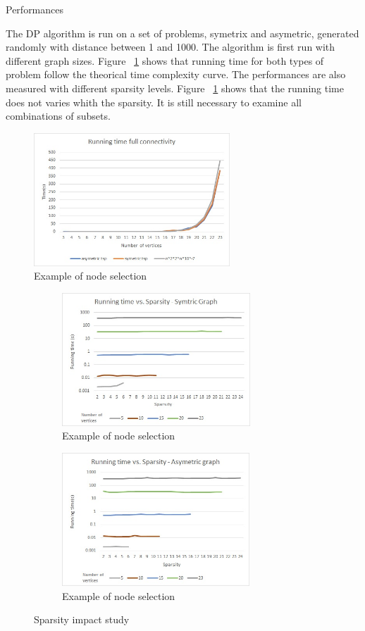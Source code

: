 \documentclass[../report.tex]{subfiles}
\begin{document}
\begin{subsection}{Performances}

The DP algorithm is run on a set of problems, symetrix and asymetric, generated randomly with distance between 1 and 1000. 
The algorithm is first run with different graph sizes. Figure ~\ref{fig:dpgraphsize} shows that running time for both types of problem follow the theorical time complexity curve.
The performances are also measured with different sparsity levels. Figure ~\ref{fig:dpgraphsize} shows that the running time does not varies whith the sparsity. It is still necessary to examine all combinations of subsets.


\begin{figure}[H]
\centering
\includegraphics[height=5cm,valign=t]{./Images/dp_sizegraph.jpg}
\caption{Example of node selection \label{fig:dpgraphsize}}
\end{figure}

\begin{figure}[H]
\centering
\begin{subfigure}{.5\textwidth}
\includegraphics[height=5cm,valign=t]{./Images/dp_sym_sparsity.jpg}
\caption{Example of node selection \label{fig:dpgsparsitysym}}
\end{subfigure}%
\begin{subfigure}{.5\textwidth}
\includegraphics[height=5cm,valign=t]{./Images/dp_asym_sparsity.jpg}
\caption{Example of node selection \label{fig:dpgsparsityasym}}
\end{subfigure}%
\caption{Sparsity impact study\label{fig:dpperf}}
\end{figure}


\end{subsection}
\end{document}
